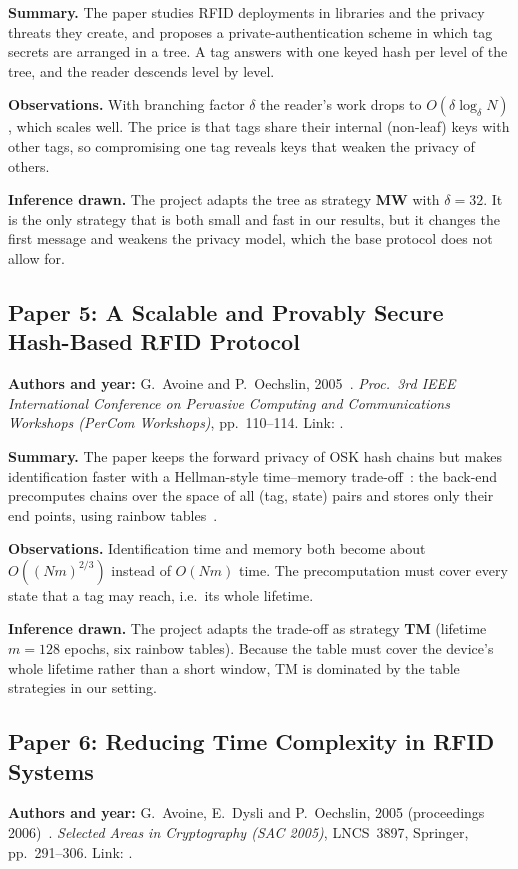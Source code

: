 \textbf{Summary.} The paper studies RFID deployments in libraries and the privacy threats they create, and proposes a private-authentication scheme in which tag secrets are arranged in a tree. A tag answers with one keyed hash per level of the tree, and the reader descends level by level.

\textbf{Observations.} With branching factor $\delta$ the reader's work drops to $O(\delta\log_\delta N)$, which scales well. The price is that tags share their internal (non-leaf) keys with other tags, so compromising one tag reveals keys that weaken the privacy of others.

\textbf{Inference drawn.} The project adapts the tree as strategy \textbf{MW} with $\delta=32$. It is the only strategy that is both small and fast in our results, but it changes the first message and weakens the privacy model, which the base protocol does not allow for.

\subsection*{Paper 5: A Scalable and Provably Secure Hash-Based RFID Protocol}
\textbf{Authors and year:} G.~Avoine and P.~Oechslin, 2005~\cite{avoine05}. \emph{Proc.\ 3rd IEEE International Conference on Pervasive Computing and Communications Workshops (PerCom Workshops)}, pp.~110--114. Link: .

\textbf{Summary.} The paper keeps the forward privacy of OSK hash chains but makes identification faster with a Hellman-style time--memory trade-off~\cite{hellman}: the back-end precomputes chains over the space of all (tag, state) pairs and stores only their end points, using rainbow tables~\cite{oechslin}.

\textbf{Observations.} Identification time and memory both become about $O((Nm)^{2/3})$ instead of $O(Nm)$ time. The precomputation must cover every state that a tag may reach, i.e.\ its whole lifetime.

\textbf{Inference drawn.} The project adapts the trade-off as strategy \textbf{TM} (lifetime $m=128$ epochs, six rainbow tables). Because the table must cover the device's whole lifetime rather than a short window, TM is dominated by the table strategies in our setting.

\subsection*{Paper 6: Reducing Time Complexity in RFID Systems}
\textbf{Authors and year:} G.~Avoine, E.~Dysli and P.~Oechslin, 2005 (proceedings 2006)~\cite{ado05}. \emph{Selected Areas in Cryptography (SAC 2005)}, LNCS~3897, Springer, pp.~291--306. Link: .

